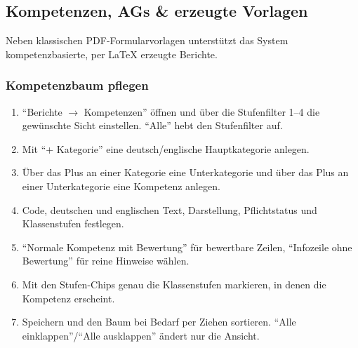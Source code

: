 \documentclass[12pt,a4paper]{article}
\begin{document}
\subsection{Kompetenzen, AGs \& erzeugte Vorlagen}
Neben klassischen PDF-Formularvorlagen unterstützt das System kompetenzbasierte, per LaTeX erzeugte Berichte.

\subsubsection{Kompetenzbaum pflegen}
\begin{enumerate}
  \item \enquote{Berichte \(\rightarrow\) Kompetenzen} öffnen und über die Stufenfilter 1--4 die gewünschte Sicht einstellen. \enquote{Alle} hebt den Stufenfilter auf.
  \item Mit \enquote{+ Kategorie} eine deutsch/englische Hauptkategorie anlegen.
  \item Über das Plus an einer Kategorie eine Unterkategorie und über das Plus an einer Unterkategorie eine Kompetenz anlegen.
  \item Code, deutschen und englischen Text, Darstellung, Pflichtstatus und Klassenstufen festlegen.
  \item \enquote{Normale Kompetenz mit Bewertung} für bewertbare Zeilen, \enquote{Infozeile ohne Bewertung} für reine Hinweise wählen.
  \item Mit den Stufen-Chips genau die Klassenstufen markieren, in denen die Kompetenz erscheint.
  \item Speichern und den Baum bei Bedarf per Ziehen sortieren. \enquote{Alle einklappen}/\enquote{Alle ausklappen} ändert nur die Ansicht.
\end{enumerate}
\end{document}
